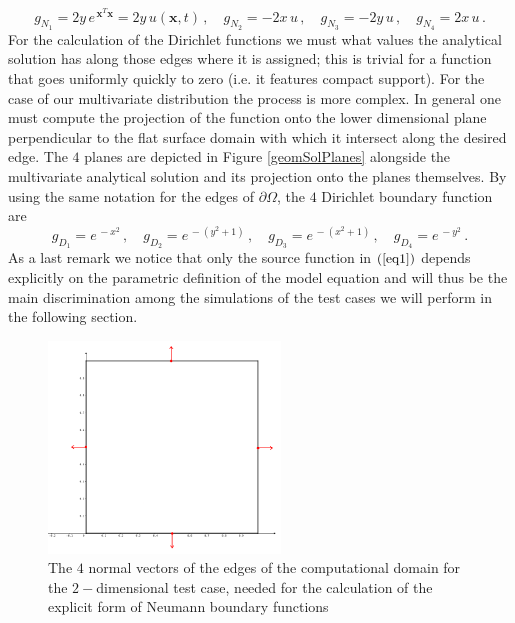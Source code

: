\documentclass[12pt,openany,twoside,a4paper]{article}
\begin{document}
\begin{equation*}
    g_{N_{1}} = 2y\,e^{\,\mathbf{x}^T\mathbf{x}} = 2y\,u(\mathbf{x},t)\,,\quad
    g_{N_{2}} = -2x\,u\,,\quad
    g_{N_{3}} = -2y\,u\,,\quad
    g_{N_{4}} = 2x\,u\,.
\end{equation*}
For the calculation of the Dirichlet functions we must what values the analytical solution has along those edges where it is assigned; this is trivial for a function that goes uniformly quickly to zero (i.e. it features  compact support). For the case of our multivariate distribution the process is more complex. In general one must compute the projection of the function onto the lower dimensional plane perpendicular to the flat surface domain with which it intersect along the desired edge. The $4$ planes are depicted in Figure \ref{geomSolPlanes} alongside the multivariate analytical solution and its projection onto the planes themselves. By using the same notation for the edges of $\partial\Omega$, the $4$ Dirichlet boundary function are 
\begin{equation*}
    g_{D_{1}} = e^{\,-x^2}\,,\quad
    g_{D_{2}} = e^{\,-(y^2+1)}\,,\quad
    g_{D_{3}} = e^{\,-(x^2+1)}\,,\quad
    g_{D_{4}} = e^{\,-y^2}\,.
\end{equation*}
As a last remark we notice that only the source function in $(\ref{eq1})$ depends explicitly on the parametric definition of the model equation and will thus be the main discrimination among the simulations of the test cases we will perform in the following section.
\newpage
\begin{figure}[H]
    \centering
    \includegraphics[keepaspectratio, width = 0.55\textwidth]{geomSquare.png}
    \caption{The $4$ normal vectors of the edges of the computational domain for the $2-$dimensional test case, needed for the calculation of the explicit form of Neumann boundary functions}
        \label{geomSquare}
\end{figure}
\end{document}
